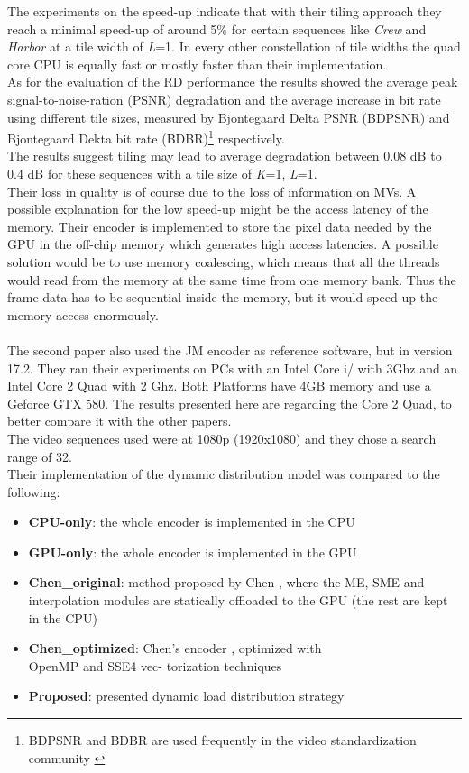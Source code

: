 The experiments on the speed-up indicate that with their tiling approach they reach a minimal speed-up of around 5\% for certain sequences like \textit{Crew} and \textit{Harbor} at a tile width of \textit{L}=1. In every other constellation of tile widths the quad core CPU is equally fast or mostly faster than their implementation.\\
As for the evaluation of the RD performance the results showed the average peak signal-to-noise-ration (PSNR) degradation and the average increase in bit rate using different tile sizes, measured by Bjontegaard Delta PSNR (BDPSNR) and Bjontegaard Dekta bit rate (BDBR)\footnote{BDPSNR and BDBR are used frequently in the video standardization community \cite{bjontegaard}} respectively.\\
The results suggest tiling may lead to average degradation between 0.08 dB to 0.4 dB for these sequences with a tile size of \textit{K}=1, \textit{L}=1.\\
Their loss in quality is of course due to the loss of information on MVs. A possible explanation for the low speed-up might be the access latency of the memory. Their encoder is implemented to store the pixel data needed by the GPU in the off-chip memory which generates high access latencies. A possible solution would be to use memory coalescing, which means that all the threads would read from the memory at the same time from one memory bank. Thus the frame data has to be sequential inside the memory, but it would speed-up the memory access enormously.\\
\\
The second paper \cite{Paper2} also used the JM encoder as reference software, but in version 17.2. They ran their experiments on PCs with an Intel Core i/ with 3Ghz and an Intel Core 2 Quad with 2 Ghz. Both Platforms have 4GB memory and use a Geforce GTX 580. The results presented here are regarding the Core 2 Quad, to better compare it with the other papers.\\
The video sequences used were at 1080p (1920x1080) and they chose a search range of 32.\\
Their implementation of the dynamic distribution model was compared to the following:\\
\begin{itemize}
\item \textbf{CPU-only}: the whole encoder is implemented in the CPU
\item \textbf{GPU-only}: the whole encoder is implemented in the GPU
\item \textbf{Chen\_original}: method proposed by Chen \cite{chen2008h}, where the ME, SME and
interpolation modules are statically offloaded to the GPU
(the rest are kept in the CPU)
\item \textbf{Chen\_optimized}: Chen's encoder \cite{chen2008h}, optimized with \\OpenMP and SSE4 vec-
torization techniques
\item \textbf{Proposed}: presented dynamic load distribution strategy
\end{itemize}
